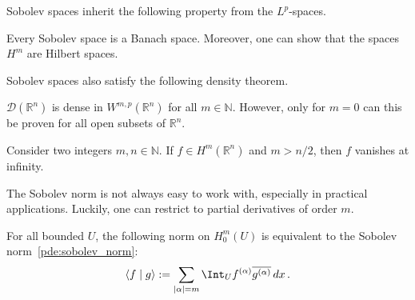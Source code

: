 
    Sobolev spaces inherit the following property from the $L^p$-spaces.
    \begin{property}[Completeness]
        Every Sobolev space is a Banach space. Moreover, one can show that the spaces $H^m$ are Hilbert spaces.
    \end{property}
    Sobolev spaces also satisfy the following density theorem.
    \begin{property}
        $\mathcal{D}(\mathbb{R}^n)$ is dense in $W^{m,p}(\mathbb{R}^n)$ for all $m\in\mathbb{N}$. However, only for $m=0$ can this be proven for all open subsets of $\mathbb{R}^n$.
    \end{property}

    \begin{property}
        Consider two integers $m,n\in\mathbb{N}$. If $f\in H^m(\mathbb{R}^n)$ and $m>n/2$, then $f$ vanishes at infinity.
    \end{property}

    The Sobolev norm is not always easy to work with, especially in practical applications. Luckily, one can restrict to partial derivatives of order $m$.
    \begin{theorem}[Friedrich]
        For all bounded $U$, the following norm on $H^m_0(U)$ is equivalent to the Sobolev norm~\eqref{pde:sobolev_norm}:
        \begin{gather}
            \langle f\mid g \rangle := \sum_{|\alpha|=m}\Int_U f^{(\alpha)}\overline{g^{(\alpha)}}\,dx\,.
        \end{gather}
    \end{theorem}

